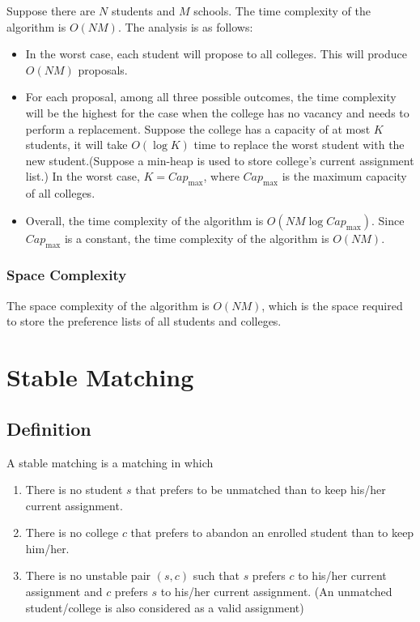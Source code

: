 \documentclass[a4paper,12pt]{article}
\begin{document}
Suppose there are $N$ students and $M$ schools.
The time complexity of the algorithm is $O(NM)$.
The analysis is as follows:

\begin{itemize}
	\item In the worst case, each student will propose to all colleges.
		This will produce $O(NM)$ proposals.
	\item For each proposal, among all three possible outcomes, the time complexity will be the highest for the case when the college has no vacancy and needs to perform a replacement.
		Suppose the college has a capacity of at most $K$ students, it will take $O(\log K)$ time to replace the worst student with the new student.(Suppose a min-heap is used to store college's current assignment list.)
		In the worst case, $K = Cap_{\max}$, where $Cap_{\max}$ is the maximum capacity of all colleges.
	\item Overall, the time complexity of the algorithm is $O(NM\log Cap_{\max})$.
		Since $Cap_{\max}$ is a constant, the time complexity of the algorithm is $O(NM)$.
\end{itemize}

\subsubsection*{Space Complexity}

The space complexity of the algorithm is $O(NM)$, which is the space required to store the preference lists of all students and colleges.

\section*{Stable Matching}

\subsection*{Definition}

A stable matching is a matching in which

\begin{enumerate}
	\item There is no student $s$ that prefers to be unmatched than to keep his/her current assignment.
	\item There is no college $c$ that prefers to abandon an enrolled student than to keep him/her.
	\item There is no unstable pair $(s, c)$ such that $s$ prefers $c$ to his/her current assignment and $c$ prefers $s$ to his/her current assignment. (An unmatched student/college is also considered as a valid assignment)
\end{enumerate}
\end{document}
